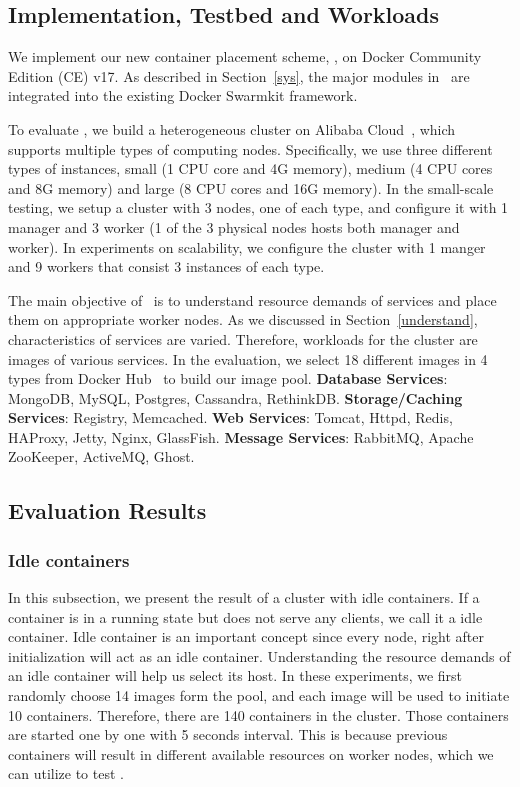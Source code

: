 \subsection{Implementation, Testbed and Workloads}
We implement our new container placement 
scheme, \sol, on Docker Community Edition (CE) v17. 
As described in Section~\ref{sys}, the major modules in \sol~are integrated into the existing
Docker Swarmkit framework. 

To evaluate \sol, we build a heterogeneous cluster on Alibaba Cloud~\cite{aliyun}, which supports multiple types of computing nodes.
Specifically, we use three different types of instances, small (1 CPU core and 4G memory), medium (4 CPU cores and 8G memory)
and large (8 CPU cores and 16G memory).
In the small-scale testing, we setup a cluster with 3 nodes, one of each type, and configure it with 1 manager and 3 worker (1 of the 3 physical nodes 
hosts both manager and worker). In experiments on scalability, we configure the cluster with 1 manger and 9 workers that consist 3 instances of each type. 

The main objective of \sol~is to understand resource demands of services and place them on appropriate worker nodes.
As we discussed in Section~\ref{understand}, characteristics of services are varied. 
Therefore, workloads for the cluster are images of various services. In the evaluation,
we select 18 different images in 4 types from Docker Hub~\cite{dockerhub} to build our image pool. 
{\bf Database Services}:  MongoDB, MySQL, Postgres, Cassandra, RethinkDB.
{\bf Storage/Caching Services}:  Registry, Memcached.
{\bf Web Services}: Tomcat, Httpd, Redis, HAProxy, Jetty, Nginx, GlassFish.
{\bf Message Services}: RabbitMQ, Apache ZooKeeper, ActiveMQ, Ghost.




\subsection{Evaluation Results}
\subsubsection{Idle containers}
In this subsection, we present the result of a cluster with idle containers.
If a container is in a running state but does not serve any clients, we call it a idle container.
Idle container is an important concept since every node, right after initialization will act as an idle container.
Understanding the resource demands of an idle container will help us select its host.
In these experiments, we first randomly choose 14 images form the pool, and each image will be used to initiate 10
containers. Therefore, there are 140 containers in the cluster. 
Those containers are started one by one with 5 seconds interval. 
This is because previous containers will result in  different available resources on worker nodes, which we can utilize 
to test \sol.

